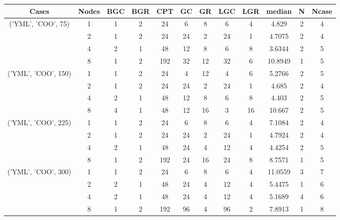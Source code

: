 \begin{tabular}{cccccccccccc}
\hline
Cases & Nodes& BGC& BGR& CPT& GC& GR& LGC& LGR& median & N & Ncase \\
\hline
\multirow{4}{*}{('YML', 'COO', 75)}& 1& 1& 2& 24& 6& 8& 6& 4& 4.829& 2& 4\\
& 2& 1& 2& 24& 24& 2& 24& 1& 4.7075& 2& 4\\
& 4& 2& 1& 48& 12& 8& 6& 8& 3.6344& 2& 5\\
& 8& 1& 2& 192& 32& 12& 32& 6& 10.8949& 1& 5\\
\hline
\multirow{4}{*}{('YML', 'COO', 150)}& 1& 1& 2& 24& 4& 12& 4& 6& 5.2766& 2& 5\\
& 2& 1& 2& 24& 24& 2& 24& 1& 4.685& 2& 4\\
& 4& 2& 1& 48& 12& 8& 6& 8& 4.403& 2& 5\\
& 8& 4& 1& 48& 12& 16& 3& 16& 10.667& 2& 5\\
\hline
\multirow{4}{*}{('YML', 'COO', 225)}& 1& 1& 2& 24& 6& 8& 6& 4& 7.1084& 2& 4\\
& 2& 1& 2& 24& 24& 2& 24& 1& 4.7924& 2& 4\\
& 4& 2& 1& 48& 24& 4& 12& 4& 4.4254& 2& 5\\
& 8& 1& 2& 192& 24& 16& 24& 8& 8.7571& 1& 5\\
\hline
\multirow{4}{*}{('YML', 'COO', 300)}& 1& 1& 2& 24& 6& 8& 6& 4& 11.0559& 3& 7\\
& 2& 2& 1& 48& 24& 4& 12& 4& 5.4475& 1& 6\\
& 4& 2& 1& 48& 24& 4& 12& 4& 5.1689& 4& 6\\
& 8& 1& 2& 192& 96& 4& 96& 2& 7.8913& 1& 8\\
\hline
\end{tabular}



